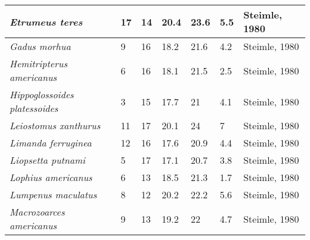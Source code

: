 \documentclass[a4paper]{article} %
\begin{document}
\begin{landscape}
\begin{longtable}[]{|l|p{1.8cm}|p{2cm}|p{2cm}|p{2.15cm}|p{1.9cm}|l|}
    \textit{Etrumeus teres}                  & 17                           & 14                         & 20.4                          & 23.6                              & 5.5                      & Steimle, 1980                \\ \hline
    \textit{Gadus morhua}                    & 9                            & 16                         & 18.2                          & 21.6                              & 4.2                      & Steimle, 1980                \\ \hline
    \textit{Hemitripterus americanus}        & 6                            & 16                         & 18.1                          & 21.5                              & 2.5                      & Steimle, 1980                \\ \hline
    \textit{Hippoglossoides platessoides}    & 3                            & 15                         & 17.7                          & 21                                & 4.1                      & Steimle, 1980                \\ \hline
    \textit{Leiostomus xanthurus}            & 11                           & 17                         & 20.1                          & 24                                & 7                        & Steimle, 1980                \\ \hline
    \textit{Limanda ferruginea}              & 12                           & 16                         & 17.6                          & 20.9                              & 4.4                      & Steimle, 1980                \\ \hline
    \textit{Liopsetta putnami}               & 5                            & 17                         & 17.1                          & 20.7                              & 3.8                      & Steimle, 1980                \\ \hline
    \textit{Lophius americanus}              & 6                            & 13                         & 18.5                          & 21.3                              & 1.7                      & Steimle, 1980                \\ \hline
    \textit{Lumpenus maculatus}              & 8                            & 12                         & 20.2                          & 22.2                              & 5.6                      & Steimle, 1980                \\ \hline
    \textit{Macrozoarces americanus}         & 9                            & 13                         & 19.2                          & 22                                & 4.7                      & Steimle, 1980                \\ \hline

\end{longtable}
\end{landscape}
\end{document}
